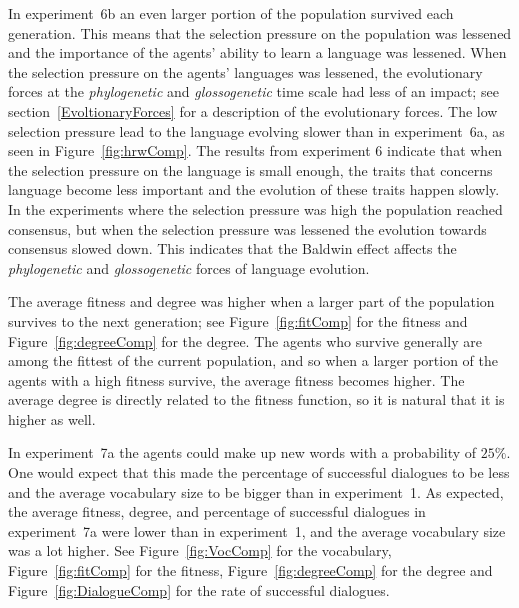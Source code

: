 In experiment~6b an even larger portion of the population survived each generation. This means that the selection pressure on the population was lessened and the importance of the agents' ability to learn a language was lessened. When the selection pressure on the agents' languages was lessened, the evolutionary forces at the \textit{phylogenetic} and \textit{glossogenetic} time scale had less of an impact; see section~\ref{EvoltionaryForces} for a description of the evolutionary forces. The low selection pressure lead to the language evolving slower than in experiment~6a, as seen in Figure~\ref{fig:hrwComp}. The results from experiment 6 indicate that when the selection pressure on the language is small enough, the traits that concerns language become less important and the evolution of these traits happen slowly. In the experiments where the selection pressure was high the population reached consensus, but when the selection pressure was lessened the evolution towards consensus slowed down. This indicates that the Baldwin effect affects the \textit{phylogenetic} and \textit{glossogenetic} forces of language evolution. 

The average fitness and degree was higher when a larger part of the population survives to the next generation; see Figure~\ref{fig:fitComp} for the fitness and Figure~\ref{fig:degreeComp} for the degree. The agents who survive generally are among the fittest of the current population, and so when a larger portion of the agents with a high fitness survive, the average fitness becomes higher. The average degree is directly related to the fitness function, so it is natural that it is higher as well.

In experiment~7a the agents could make up new words with a probability of $25\%$. One would expect that this made the percentage of successful dialogues to be less and the average vocabulary size to be bigger than in experiment~1. As expected, the average fitness, degree, and percentage of successful dialogues in experiment~7a were lower than in experiment~1, and the average vocabulary size was a lot higher. See Figure~\ref{fig:VocComp} for the vocabulary, Figure~\ref{fig:fitComp} for the fitness, Figure~\ref{fig:degreeComp} for the degree and Figure~\ref{fig:DialogueComp} for the rate of successful dialogues. 

